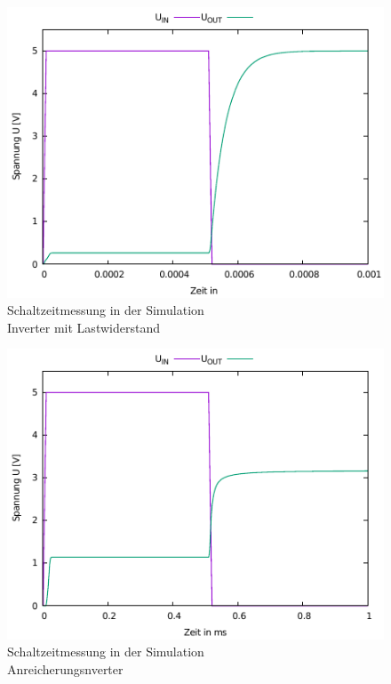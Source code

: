 \documentclass[11pt, a4paper]{article}
\begin{document}
\begin{figure}
    \centering
    \includegraphics[width=\linewidth]{simTimeLast.pdf}
    \caption{Schaltzeitmessung in der Simulation \\ Inverter mit Lastwiderstand}
    \label{simTimeLast}
\end{figure}
\begin{figure}
    \centering
    \includegraphics[width=\linewidth]{simTimeAnreicherung.pdf}
    \caption{Schaltzeitmessung in der Simulation \\ Anreicherungsnverter}
    \label{simTimeAnreicherung}
\end{figure}
\end{document}
